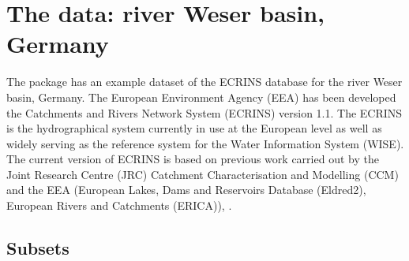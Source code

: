 \documentclass{article}
\begin{document}
\section{The data: river Weser basin, Germany}

The package has an example dataset of the ECRINS database for the river Weser basin, Germany. The European Environment Agency (EEA) has been developed the Catchments and Rivers Network System (ECRINS) version 1.1. The ECRINS is the hydrographical system currently in use at the European level as well as widely serving as the reference system for the Water Information System (WISE). The current version of ECRINS is based on previous work carried out by the Joint Research Centre (JRC) Catchment Characterisation and Modelling (CCM) and the EEA (European Lakes, Dams and Reservoirs Database (Eldred2), European Rivers and Catchments (ERICA)), \cite{EEA(2012)}.

\subsection{Subsets}
\end{document}
